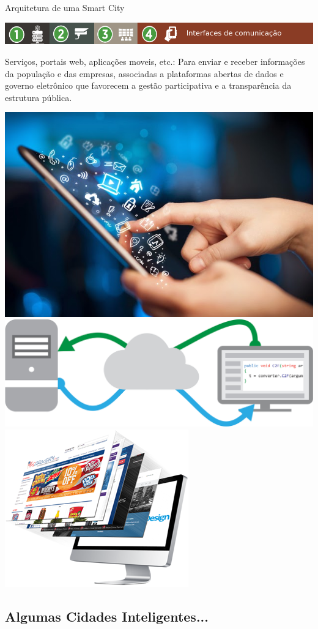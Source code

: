 \documentclass{beamer}
\begin{document}
\begin{frame}{Arquitetura de uma Smart City}
\begin{center}
\includegraphics[width=1\textwidth]{img/arquitetura-menu-4.png}  
\end{center}
\begin{exampleblock}{Serviços, portais web, aplicações moveis, etc.:  }
 Para enviar 
e receber informações da população e das empresas, 
associadas a plataformas abertas de dados e governo eletrônico que favorecem 
a gestão participativa e a transparência da estrutura pública.

\end{exampleblock}
\begin{center}
\includegraphics[width=.3\textwidth]{img/pagina-2.jpg}  
\includegraphics[width=.4\textwidth]{img/pagina_3.png}  
\includegraphics[width=.25\textwidth]{img/pagina_1.png}  
\end{center}


\end{frame}
















\subsection{Algumas Cidades Inteligentes...}
\end{document}
